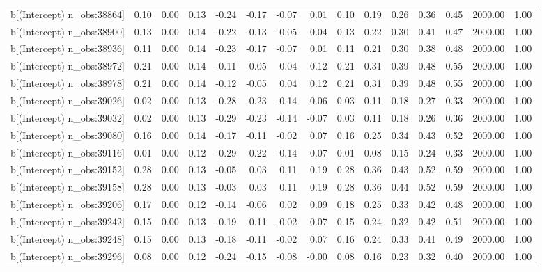 \begin{table}[ht]
\begin{tabular}{rrrrrrrrrrrrrrr}
  b[(Intercept) n\_obs:38864] & 0.10 & 0.00 & 0.13 & -0.24 & -0.17 & -0.07 & 0.01 & 0.10 & 0.19 & 0.26 & 0.36 & 0.45 & 2000.00 & 1.00 \\ 
  b[(Intercept) n\_obs:38900] & 0.13 & 0.00 & 0.14 & -0.22 & -0.13 & -0.05 & 0.04 & 0.13 & 0.22 & 0.30 & 0.41 & 0.47 & 2000.00 & 1.00 \\ 
  b[(Intercept) n\_obs:38936] & 0.11 & 0.00 & 0.14 & -0.23 & -0.17 & -0.07 & 0.01 & 0.11 & 0.21 & 0.30 & 0.38 & 0.48 & 2000.00 & 1.00 \\ 
  b[(Intercept) n\_obs:38972] & 0.21 & 0.00 & 0.14 & -0.11 & -0.05 & 0.04 & 0.12 & 0.21 & 0.31 & 0.39 & 0.48 & 0.55 & 2000.00 & 1.00 \\ 
  b[(Intercept) n\_obs:38978] & 0.21 & 0.00 & 0.14 & -0.12 & -0.05 & 0.04 & 0.12 & 0.21 & 0.31 & 0.39 & 0.48 & 0.55 & 2000.00 & 1.00 \\ 
  b[(Intercept) n\_obs:39026] & 0.02 & 0.00 & 0.13 & -0.28 & -0.23 & -0.14 & -0.06 & 0.03 & 0.11 & 0.18 & 0.27 & 0.33 & 2000.00 & 1.00 \\ 
  b[(Intercept) n\_obs:39032] & 0.02 & 0.00 & 0.13 & -0.29 & -0.23 & -0.14 & -0.07 & 0.03 & 0.11 & 0.18 & 0.26 & 0.36 & 2000.00 & 1.00 \\ 
  b[(Intercept) n\_obs:39080] & 0.16 & 0.00 & 0.14 & -0.17 & -0.11 & -0.02 & 0.07 & 0.16 & 0.25 & 0.34 & 0.43 & 0.52 & 2000.00 & 1.00 \\ 
  b[(Intercept) n\_obs:39116] & 0.01 & 0.00 & 0.12 & -0.29 & -0.22 & -0.14 & -0.07 & 0.01 & 0.08 & 0.15 & 0.24 & 0.33 & 2000.00 & 1.00 \\ 
  b[(Intercept) n\_obs:39152] & 0.28 & 0.00 & 0.13 & -0.05 & 0.03 & 0.11 & 0.19 & 0.28 & 0.36 & 0.43 & 0.52 & 0.59 & 2000.00 & 1.00 \\ 
  b[(Intercept) n\_obs:39158] & 0.28 & 0.00 & 0.13 & -0.03 & 0.03 & 0.11 & 0.19 & 0.28 & 0.36 & 0.44 & 0.52 & 0.59 & 2000.00 & 1.00 \\ 
  b[(Intercept) n\_obs:39206] & 0.17 & 0.00 & 0.12 & -0.14 & -0.06 & 0.02 & 0.09 & 0.18 & 0.25 & 0.33 & 0.42 & 0.48 & 2000.00 & 1.00 \\ 
  b[(Intercept) n\_obs:39242] & 0.15 & 0.00 & 0.13 & -0.19 & -0.11 & -0.02 & 0.07 & 0.15 & 0.24 & 0.32 & 0.42 & 0.51 & 2000.00 & 1.00 \\ 
  b[(Intercept) n\_obs:39248] & 0.15 & 0.00 & 0.13 & -0.18 & -0.11 & -0.02 & 0.07 & 0.16 & 0.24 & 0.33 & 0.41 & 0.49 & 2000.00 & 1.00 \\ 
  b[(Intercept) n\_obs:39296] & 0.08 & 0.00 & 0.12 & -0.24 & -0.15 & -0.08 & -0.00 & 0.08 & 0.16 & 0.23 & 0.32 & 0.40 & 2000.00 & 1.00 \\ 

\end{tabular}
\end{table}

